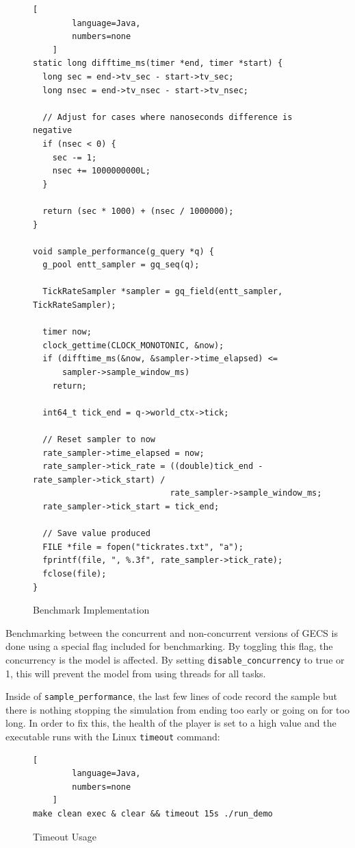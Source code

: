 \begin{figure}[htbp]
    \begin{lstlisting}[
        language=Java,
        numbers=none
    ]
static long difftime_ms(timer *end, timer *start) {
  long sec = end->tv_sec - start->tv_sec;
  long nsec = end->tv_nsec - start->tv_nsec;

  // Adjust for cases where nanoseconds difference is negative
  if (nsec < 0) {
    sec -= 1;
    nsec += 1000000000L;
  }

  return (sec * 1000) + (nsec / 1000000);
}

void sample_performance(g_query *q) {
  g_pool entt_sampler = gq_seq(q);

  TickRateSampler *sampler = gq_field(entt_sampler, TickRateSampler);

  timer now;
  clock_gettime(CLOCK_MONOTONIC, &now);
  if (difftime_ms(&now, &sampler->time_elapsed) <=
      sampler->sample_window_ms)
    return;

  int64_t tick_end = q->world_ctx->tick;

  // Reset sampler to now
  rate_sampler->time_elapsed = now;
  rate_sampler->tick_rate = ((double)tick_end - rate_sampler->tick_start) /
                            rate_sampler->sample_window_ms;
  rate_sampler->tick_start = tick_end;

  // Save value produced
  FILE *file = fopen("tickrates.txt", "a");
  fprintf(file, ", %.3f", rate_sampler->tick_rate);
  fclose(file);
}
    \end{lstlisting}
    \caption{Benchmark Implementation}
    \label{code:impl}
\end{figure}

Benchmarking between the concurrent and non-concurrent versions of GECS is done using a special flag included for benchmarking. By toggling this flag, the concurrency is the model is affected. By setting \texttt{disable\_concurrency} to true or 1, this will prevent the model from using threads for all tasks.

Inside of \texttt{sample\_performance}, the last few lines of code record the sample but there is nothing stopping the simulation from ending too early or going on for too long. In order to fix this, the health of the player is set to a high value and the executable runs with the Linux \texttt{timeout} command:

\begin{figure}[htbp]
    \begin{lstlisting}[
        language=Java,
        numbers=none
    ]
make clean exec & clear && timeout 15s ./run_demo
    \end{lstlisting}
    \caption{Timeout Usage}
    \label{code:timeout_usage}
\end{figure}

